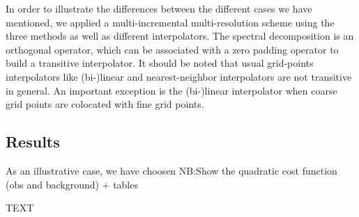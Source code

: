 \documentclass[npg, manuscript]{copernicus}
\begin{document}
In order to illustrate the differences between the different cases we have mentioned, we applied a multi-incremental multi-resolution scheme using the three methods as well as different interpolators. The spectral decomposition is an orthogonal operator, which can be associated with a zero padding operator to build a transitive interpolator. It should be noted that usual grid-points interpolators like (bi-)linear and nearest-neighbor interpolators are not transitive in general. An important exception is the (bi-)linear interpolator when coarse grid points are colocated with fine grid points.

\subsection{Results}
As an illustrative case, we have choosen 
NB:Show the quadratic cost function (obs and background) + tables



\conclusions  %
TEXT












\appendix



\noappendix       %

\end{document}
